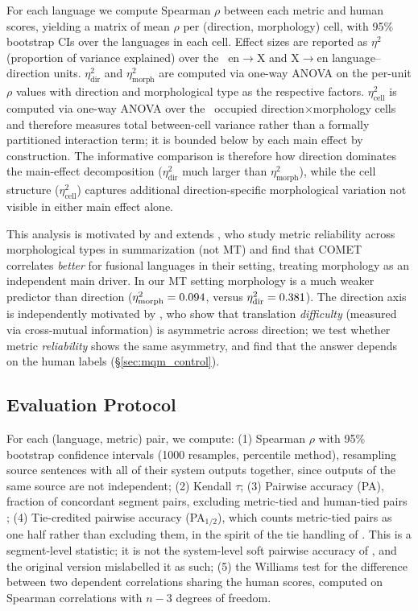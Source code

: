 \documentclass[11pt]{article}
\newcommand{\PAhalf}{PA$_{1/2}$}
\begin{document}
For each language we compute Spearman $\rho$ between each metric and human scores, yielding a matrix of mean $\rho$ per (direction, morphology) cell, with 95\% bootstrap CIs over the languages in each cell. Effect sizes are reported as $\eta^2$ (proportion of variance explained) over the \EtaSqNUnits\ en$\to$X and X$\to$en language--direction units. $\eta^2_{\text{dir}}$ and $\eta^2_{\text{morph}}$ are computed via one-way ANOVA on the per-unit $\rho$ values with direction and morphological type as the respective factors. $\eta^2_{\text{cell}}$ is computed via one-way ANOVA over the \EtaSqNCells\ occupied direction$\times$morphology cells and therefore measures total between-cell variance rather than a formally partitioned interaction term; it is bounded below by each main effect by construction. The informative comparison is therefore how direction dominates the main-effect decomposition ($\eta^2_{\text{dir}}$ much larger than $\eta^2_{\text{morph}}$), while the cell structure ($\eta^2_{\text{cell}}$) captures additional direction-specific morphological variation not visible in either main effect alone.

This analysis is motivated by and extends \citet{mondshine2025ngrams}, who study metric reliability across morphological types in summarization (not MT) and find that COMET correlates \emph{better} for fusional languages in their setting, treating morphology as an independent main driver. In our MT setting morphology is a much weaker predictor than direction ($\eta^2_{\text{morph}}=0.094$, versus $\eta^2_{\text{dir}}=0.381$). The direction axis is independently motivated by \citet{bugliarello2020xmi}, who show that translation \emph{difficulty} (measured via cross-mutual information) is asymmetric across direction; we test whether metric \emph{reliability} shows the same asymmetry, and find that the answer depends on the human labels (\S\ref{sec:mqm_control}).

\subsection{Evaluation Protocol}

For each (language, metric) pair, we compute:
(1) Spearman $\rho$ with 95\% bootstrap confidence intervals (1000 resamples, percentile method), resampling source sentences with all of their system outputs together, since outputs of the same source are not independent;
(2) Kendall $\tau$;
(3) Pairwise accuracy (PA), fraction of concordant segment pairs, excluding metric-tied and human-tied pairs \cite{freitag2023results};
(4) Tie-credited pairwise accuracy (\PAhalf{}), which counts metric-tied pairs as one half rather than excluding them, in the spirit of the tie handling of \citet{deutsch2023ties}. This is a segment-level statistic; it is not the system-level soft pairwise accuracy of \citet{thompson2024spa}, and the original version mislabelled it as such;
(5) the Williams test \citep{williams1959,graham2014testing} for the difference between two dependent correlations sharing the human scores, computed on Spearman correlations with $n-3$ degrees of freedom.
\end{document}
